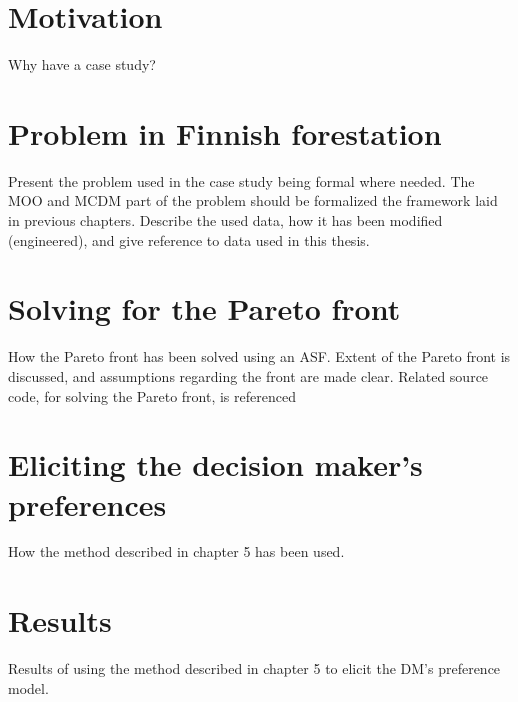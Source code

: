 \section{Motivation}
\label{casestudy}
{\color{red}
Why have a case study?
}

\section{Problem in Finnish forestation}
\label{finnishforestation}
{\color{red}
Present the problem used in the case study being formal where needed. The MOO and MCDM  part of the problem should be formalized the framework laid in
previous chapters. Describe the used data, how it has been modified (engineered), and give reference to data used in this thesis.
}

\section{Solving for the Pareto front}
{\color{red}
How the Pareto front has been solved using an ASF. Extent of the Pareto front is discussed, and assumptions regarding the front are made clear.
Related source code, for solving the Pareto front, is referenced
}

\section{Eliciting the decision maker's preferences}
{\color{red}
How the method described in chapter 5 has been used.
}

\section{Results}
{\color{red}
Results of using the method described in chapter 5 to elicit the DM's preference model.
}